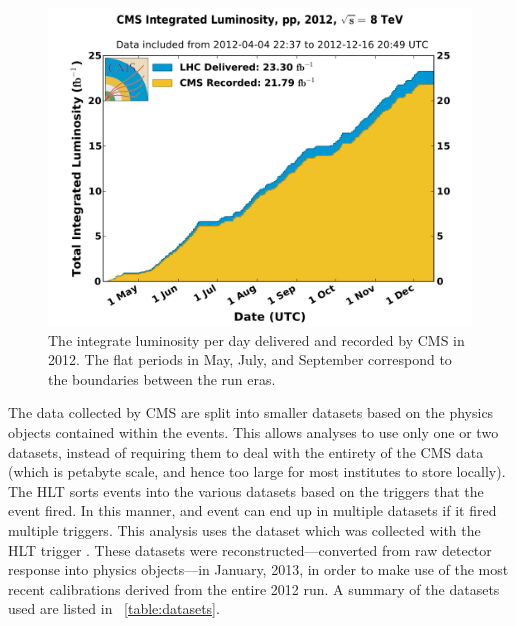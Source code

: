 \begin{figure}[tb]
    \centering
    \includegraphics[width=\textwidth]{figures/2012_lumi.pdf}
    \caption{ The integrate luminosity per day delivered and recorded by CMS in
        2012. The flat periods in May, July, and September correspond to the
        boundaries between the run eras. }
    \label{fig:2012_luminosity}
\end{figure}

The data collected by CMS are split into smaller datasets based on the physics
objects contained within the events. This allows analyses to use only one or
two datasets, instead of requiring them to deal with the entirety of the CMS
data (which is petabyte scale, and hence too large for most institutes to store
locally). The HLT sorts events into the various datasets based on the triggers
that the event fired. In this manner, and event can end up in multiple datasets
if it fired multiple triggers. This analysis uses the \SingleElectron dataset
which was collected with the HLT trigger \SingleElectronTrigger. These datasets
were reconstructed---converted from raw detector response into physics
objects---in January, 2013, in order to make use of the most recent
calibrations derived from the entire 2012 run. A summary of the datasets used
are listed in \TAB~\ref{table:datasets}.

